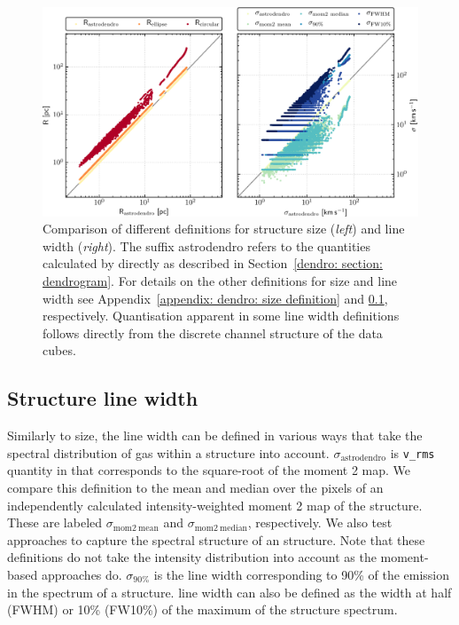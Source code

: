 \begin{figure}
    \centering
    \includegraphics[width=\linewidth]{images/chapters/papers/dendro/dendro_figA}
    \caption[Comparison of definitions for structure size and line width]{Comparison of different definitions for structure size (\emph{left}) and line width (\emph{right}). 
    The suffix astrodendro refers to the quantities calculated by \astrodendro directly as described in Section~\ref{dendro: section: dendrogram}.
    For details on the other definitions for size and line width see Appendix~\ref{appendix: dendro: size definition} and \ref{appendix: dendro: line width definition}, respectively.
    Quantisation apparent in some line width definitions follows directly from the discrete channel structure of the data cubes.
    }
    \label{dendro: figure: A}
\end{figure}


\subsection{Structure line width}
\label{appendix: dendro: line width definition}

Similarly to size, the line width can be defined in various ways that take the spectral distribution of gas within a structure into account.
$\sigma_\mathrm{astrodendro}$ is \texttt{v\_rms} quantity in \astrodendro that corresponds to the square-root of the moment 2 map.
We compare this definition to the mean and median over the pixels of an independently calculated intensity-weighted moment 2 map of the structure. These are labeled $\sigma_\mathrm{mom2\ mean}$ and $\sigma_\mathrm{mom2\ median}$, respectively.
We also test approaches to capture the spectral structure of an \astrodendro structure. Note that these definitions do not take the intensity distribution into account as the moment-based approaches do.
$\sigma_\mathrm{90\%}$ is the line width corresponding to 90\% of the emission in the spectrum of a structure.
line width can also be defined as the width at half (FWHM) or 10\% (FW10\%) of the maximum of the structure spectrum.

